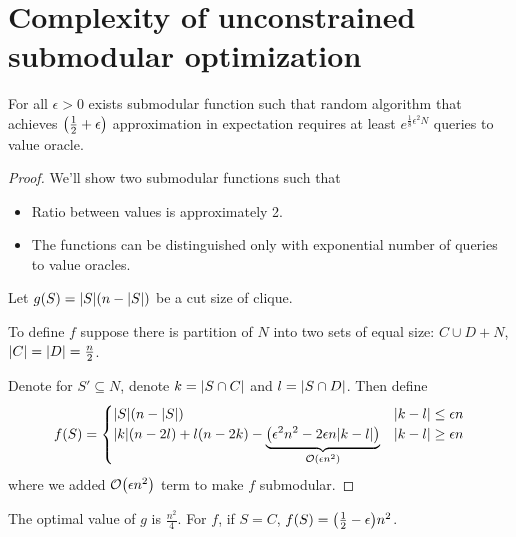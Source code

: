 \section{Complexity of unconstrained submodular optimization}
\begin{theorem}
	For all $\epsilon>0$ exists submodular function such that random algorithm that achieves  $\qty(\frac{1}{2}+\epsilon)$ approximation in expectation requires at least $e^{\frac{1}{8}\epsilon^2 N}$ queries to value oracle.
	\begin{proof}
		We'll show two submodular functions such that
		\begin{itemize}
			\item Ratio between values is approximately 2.
			\item The functions can be distinguished only with exponential number of queries to value oracles.
		\end{itemize}
	
	Let $g(S) = \abs{S} \qty(n-\abs{S})$ be a cut size of clique.
	
	To define $f$ suppose there is partition of $N$ into two sets of equal size: $C\cup D+N$, $\abs{C}=\abs{D}=\frac{n}{2}$. 
	
	Denote for $S'\subseteq N$, denote  $k=\abs{S\cap C}$ and $l=\abs{S\cap D}$. Then define
	\begin{align}
	f(S) = \begin{cases}
	\abs{S} \qty(n-\abs{S}) & \abs{k-l} \leq \epsilon n\\
	\abs{k} \qty(n-2l) + l(n-2k) - \underbrace{\qty(\epsilon^2 n^2 - 2\epsilon n \abs{k-l})}_{\order{\epsilon n^2}}& \abs{k-l} \geq \epsilon n\\
	\end{cases}
	\end{align}
	where we added $\order{\epsilon n^2}$ term to make $f$ submodular.
	\end{proof}

	The optimal value of $g$ is $\frac{n^2}{4}$. For $f$, if $S=C$, $f(S)=\qty(\frac{1}{2}-\epsilon)n^2$.
	

\end{theorem}
